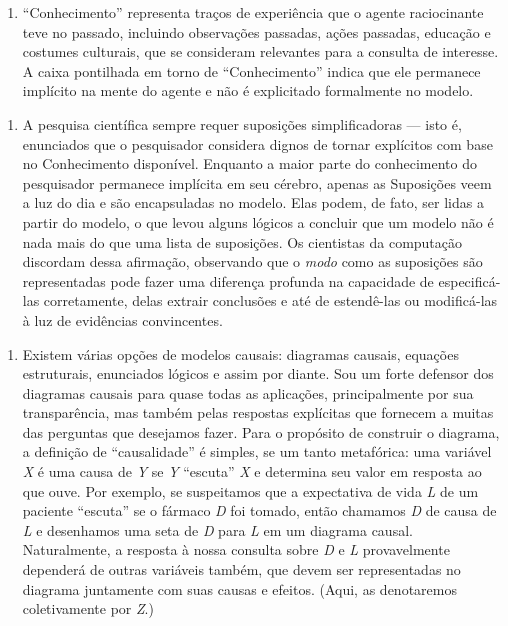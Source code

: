 \documentclass[11pt,a5paper,twoside]{book}
\begin{document}
\begin{enumerate}
\item “Conhecimento” representa traços de experiência que o agente raciocinante teve no passado, incluindo observações passadas, ações passadas, educação e costumes culturais, que se consideram relevantes para a consulta de interesse. A caixa pontilhada em torno de “Conhecimento” indica que ele permanece implícito na mente do agente e não é explicitado formalmente no modelo.
\end{enumerate}
\begin{enumerate}
\item A pesquisa científica sempre requer suposições simplificadoras — isto é, enunciados que o pesquisador considera dignos de tornar explícitos com base no Conhecimento disponível. Enquanto a maior parte do conhecimento do pesquisador permanece implícita em seu cérebro, apenas as Suposições veem a luz do dia e são encapsuladas no modelo. Elas podem, de fato, ser lidas a partir do modelo, o que levou alguns lógicos a concluir que um modelo não é nada mais do que uma lista de suposições. Os cientistas da computação discordam dessa afirmação, observando que o \textit{modo} como as suposições são representadas pode fazer uma diferença profunda na capacidade de especificá-las corretamente, delas extrair conclusões e até de estendê-las ou modificá-las à luz de evidências convincentes.
\end{enumerate}
\begin{enumerate}
\item Existem várias opções de modelos causais: diagramas causais, equações estruturais, enunciados lógicos e assim por diante. Sou um forte defensor dos diagramas causais para quase todas as aplicações, principalmente por sua transparência, mas também pelas respostas explícitas que fornecem a muitas das perguntas que desejamos fazer. Para o propósito de construir o diagrama, a definição de “causalidade” é simples, se um tanto metafórica: uma variável \textit{X} é uma causa de \textit{Y} se \textit{Y} “escuta” \textit{X} e determina seu valor em resposta ao que ouve. Por exemplo, se suspeitamos que a expectativa de vida \textit{L} de um paciente “escuta” se o fármaco \textit{D} foi tomado, então chamamos \textit{D} de causa de \textit{L} e desenhamos uma seta de \textit{D} para \textit{L} em um diagrama causal. Naturalmente, a resposta à nossa consulta sobre \textit{D} e \textit{L} provavelmente dependerá de outras variáveis também, que devem ser representadas no diagrama juntamente com suas causas e efeitos. (Aqui, as denotaremos coletivamente por \textit{Z}.)
\end{enumerate}
\end{document}
